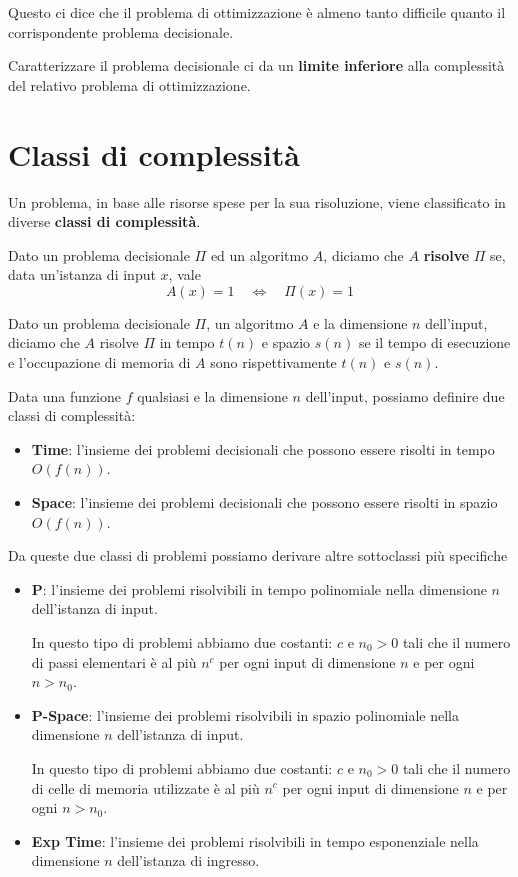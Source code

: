 Questo ci dice che il problema di ottimizzazione \`e almeno tanto difficile quanto il corrispondente problema
decisionale.

Caratterizzare il problema decisionale ci da un \textbf{limite inferiore} alla complessit\`a del relativo problema di
ottimizzazione.

\section{Classi di complessit\`a}\label{classi}
Un problema, in base alle risorse spese per la sua risoluzione, viene classificato in diverse
\textbf{classi di complessit\`a}.

\begin{theorem}
	Dato un problema decisionale $\Pi$ ed un algoritmo $A$, diciamo che $A$ \textbf{risolve} $\Pi$ se, data un'istanza di
	input $x$, vale
	\[ A(x) = 1 \quad \Leftrightarrow \quad \Pi(x) = 1 \]
\end{theorem}

\begin{theorem}
	Dato un problema decisionale $\Pi$, un algoritmo $A$ e la dimensione $n$ dell'input, diciamo che $A$ risolve $\Pi$
	in tempo $t(n)$ e spazio $s(n)$ se il tempo di esecuzione e l'occupazione di memoria di $A$ sono rispettivamente
	$t(n)$ e $s(n)$.
\end{theorem}

Data una funzione $f$ qualsiasi e la dimensione $n$ dell'input, possiamo definire due classi di complessit\`a:
\begin{itemize}
	\item \textbf{Time}: l'insieme dei problemi decisionali che possono essere risolti in tempo $O(f(n))$.
	\item \textbf{Space}: l'insieme dei problemi decisionali che possono essere risolti in spazio $O(f(n))$.
\end{itemize}
Da queste due classi di problemi possiamo derivare altre sottoclassi pi\`u specifiche
\begin{itemize}
	\item \textbf{P}: l'insieme dei problemi risolvibili in tempo polinomiale nella dimensione $n$ dell'istanza di input.

	      In questo tipo di problemi abbiamo due costanti: $c$ e $n_0 > 0$ tali che il numero di passi elementari \`e al
	      pi\`u $n^c$ per ogni input di dimensione $n$ e per ogni $n > n_0$.

	\item \textbf{P-Space}: l'insieme dei problemi risolvibili in spazio polinomiale nella dimensione $n$ dell'istanza
	      di input.

	      In questo tipo di problemi abbiamo due costanti: $c$ e $n_0 > 0$ tali che il numero di celle di memoria
	      utilizzate \`e al pi\`u $n^c$ per ogni input di dimensione $n$ e per ogni $n > n_0$.
	\item \textbf{Exp Time}: l'insieme dei problemi risolvibili in tempo esponenziale nella dimensione $n$ dell'istanza
	      di ingresso.
\end{itemize}

